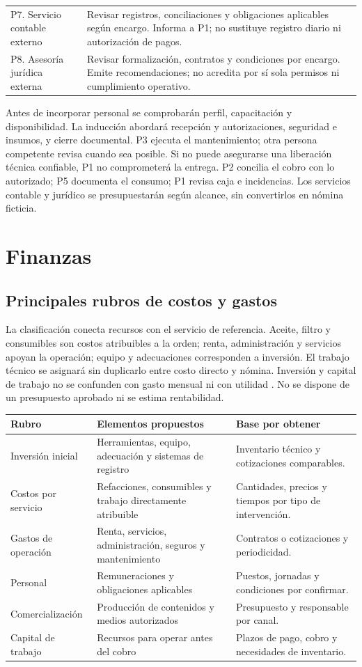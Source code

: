 {\begin{longtable}{@{}p{.25\linewidth}p{.66\linewidth}@{}}
P7. Servicio contable externo & Revisar registros, conciliaciones y obligaciones aplicables según encargo. Informa a P1; no sustituye registro diario ni autorización de pagos.\\
P8. Asesoría jurídica externa & Revisar formalización, contratos y condiciones por encargo. Emite recomendaciones; no acredita por sí sola permisos ni cumplimiento operativo.\\
\bottomrule\end{longtable}
Antes de incorporar personal se comprobarán perfil, capacitación y disponibilidad. La inducción abordará recepción y autorizaciones, seguridad e insumos, y cierre documental. P3 ejecuta el mantenimiento; otra persona competente revisa cuando sea posible. Si no puede asegurarse una liberación técnica confiable, P1 no comprometerá la entrega. P2 concilia el cobro con lo autorizado; P5 documenta el consumo; P1 revisa caja e incidencias. Los servicios contable y jurídico se presupuestarán según alcance, sin convertirlos en nómina ficticia.
\section{Finanzas}
\subsection{Principales rubros de costos y gastos}
La clasificación conecta recursos con el servicio de referencia. Aceite, filtro y consumibles son costos atribuibles a la orden; renta, administración y servicios apoyan la operación; equipo y adecuaciones corresponden a inversión. El trabajo técnico se asignará sin duplicarlo entre costo directo y nómina. Inversión y capital de trabajo no se confunden con gasto mensual ni con utilidad \citep{openstaxPlanIntegrador}. No se dispone de un presupuesto aprobado ni se estima rentabilidad.
\begin{longtable}{p{.25\linewidth}p{.30\linewidth}p{.30\linewidth}}
\toprule
\textbf{Rubro} & \textbf{Elementos propuestos} & \textbf{Base por obtener}\\
\midrule
Inversión inicial & Herramientas, equipo, adecuación y sistemas de registro & Inventario técnico y cotizaciones comparables.\\
Costos por servicio & Refacciones, consumibles y trabajo directamente atribuible & Cantidades, precios y tiempos por tipo de intervención.\\
Gastos de operación & Renta, servicios, administración, seguros y mantenimiento & Contratos o cotizaciones y periodicidad.\\
Personal & Remuneraciones y obligaciones aplicables & Puestos, jornadas y condiciones por confirmar.\\
Comercialización & Producción de contenidos y medios autorizados & Presupuesto y responsable por canal.\\
Capital de trabajo & Recursos para operar antes del cobro & Plazos de pago, cobro y necesidades de inventario.\\
\bottomrule
\end{longtable}
}
